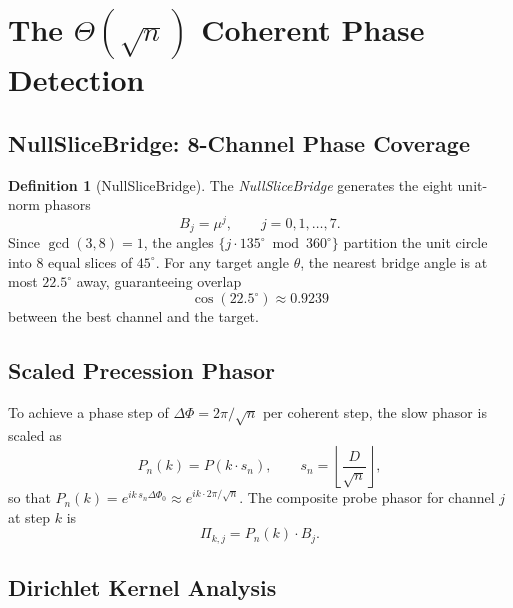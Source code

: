 \documentclass[12pt,a4paper]{article}
\theoremstyle{plain}
\theoremstyle{definition}
\newtheorem{definition}[theorem]{Definition}
\theoremstyle{remark}
\begin{document}
\section{The \texorpdfstring{$\Theta(\sqrt{n})$}{Theta(sqrt(n))} Coherent Phase Detection}
\label{sec:sqrt-n}

\subsection{NullSliceBridge: 8-Channel Phase Coverage}

\begin{definition}[NullSliceBridge]\label{def:bridge}
  The \emph{NullSliceBridge} generates the eight unit-norm phasors
  \begin{equation}
    B_j = \mu^j, \qquad j = 0,1,\ldots,7.
    \label{eq:bridge}
  \end{equation}
  Since $\gcd(3,8)=1$, the angles $\{j\cdot 135^\circ \bmod 360^\circ\}$
  partition the unit circle into 8 equal slices of $45^\circ$.  For any
  target angle $\theta$, the nearest bridge angle is at most $22.5^\circ$ away,
  guaranteeing overlap
  \begin{equation}
    \cos(22.5^\circ) \approx 0.9239
    \label{eq:bridge-overlap}
  \end{equation}
  between the best channel and the target.
\end{definition}

\subsection{Scaled Precession Phasor}

To achieve a phase step of $\Delta\Phi = 2\pi/\sqrt{n}$ per coherent step,
the slow phasor is scaled as
\begin{equation}
  P_n(k) = P(k\cdot s_n),\qquad
  s_n = \left\lfloor \frac{D}{\sqrt{n}} \right\rfloor,
  \label{eq:scaled-phasor}
\end{equation}
so that $P_n(k) = e^{ik\,s_n\Delta\Phi_0} \approx e^{ik\cdot 2\pi/\sqrt{n}}$.
The composite probe phasor for channel $j$ at step $k$ is
\begin{equation}
  \Pi_{k,j} = P_n(k)\cdot B_j.
  \label{eq:probe}
\end{equation}

\subsection{Dirichlet Kernel Analysis}
\end{document}
